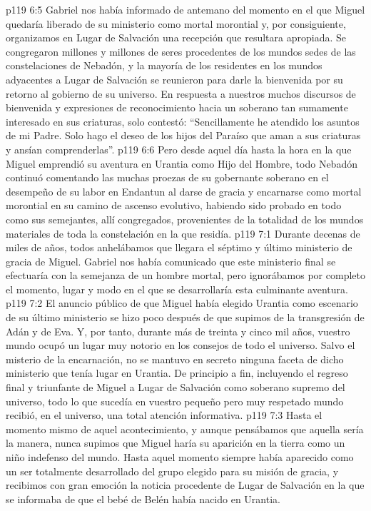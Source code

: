 \vs p119 6:5 Gabriel nos había informado de antemano del momento en el que Miguel quedaría liberado de su ministerio como mortal morontial y, por consiguiente, organizamos en Lugar de Salvación una recepción que resultara apropiada. Se congregaron millones y millones de seres procedentes de los mundos sedes de las constelaciones de Nebadón, y la mayoría de los residentes en los mundos adyacentes a Lugar de Salvación se reunieron para darle la bienvenida por su retorno al gobierno de su universo. En respuesta a nuestros muchos discursos de bienvenida y expresiones de reconocimiento hacia un soberano tan sumamente interesado en sus criaturas, solo contestó: “Sencillamente he atendido los asuntos de mi Padre. Solo hago el deseo de los hijos del Paraíso que aman a sus criaturas y ansían comprenderlas”.
\vs p119 6:6 Pero desde aquel día hasta la hora en la que Miguel emprendió su aventura en Urantia como Hijo del Hombre, todo Nebadón continuó comentando las muchas proezas de su gobernante soberano en el desempeño de su labor en Endantun al darse de gracia y encarnarse como mortal morontial en su camino de ascenso evolutivo, habiendo sido probado en todo como sus semejantes, allí congregados, provenientes de la totalidad de los mundos materiales de toda la constelación en la que residía.
\vs p119 7:1 Durante decenas de miles de años, todos anhelábamos que llegara el séptimo y último ministerio de gracia de Miguel. Gabriel nos había comunicado que este ministerio final se efectuaría con la semejanza de un hombre mortal, pero ignorábamos por completo el momento, lugar y modo en el que se desarrollaría esta culminante aventura.
\vs p119 7:2 El anuncio público de que Miguel había elegido Urantia como escenario de su último ministerio se hizo poco después de que supimos de la transgresión de Adán y de Eva. Y, por tanto, durante más de treinta y cinco mil años, vuestro mundo ocupó un lugar muy notorio en los consejos de todo el universo. Salvo el misterio de la encarnación, no se mantuvo en secreto ninguna faceta de dicho ministerio que tenía lugar en Urantia. De principio a fin, incluyendo el regreso final y triunfante de Miguel a Lugar de Salvación como soberano supremo del universo, todo lo que sucedía en vuestro pequeño pero muy respetado mundo recibió, en el universo, una total atención informativa.
\vs p119 7:3 \pc Hasta el momento mismo de aquel acontecimiento, y aunque pensábamos que aquella sería la manera, nunca supimos que Miguel haría su aparición en la tierra como un niño indefenso del mundo. Hasta aquel momento siempre había aparecido como un ser totalmente desarrollado del grupo elegido para su misión de gracia, y recibimos con gran emoción la noticia procedente de Lugar de Salvación en la que se informaba de que el bebé de Belén había nacido en Urantia.
